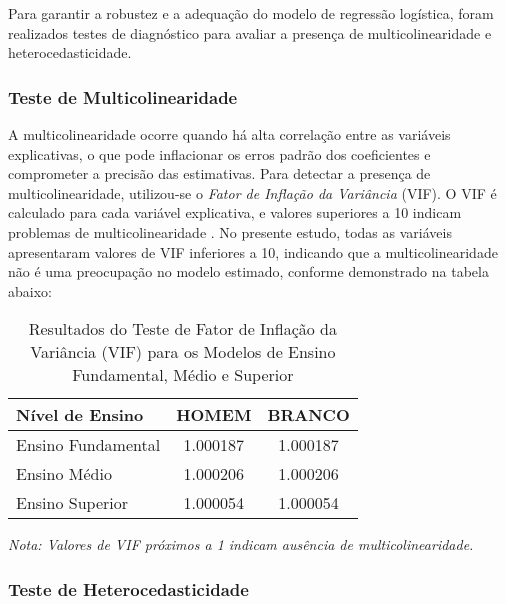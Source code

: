 \documentclass[a4paper,12pt]{article}
\begin{document}
Para garantir a robustez e a adequação do modelo de regressão logística, foram realizados testes de diagnóstico para avaliar a presença de multicolinearidade e heterocedasticidade.

\subsubsection{Teste de Multicolinearidade}

A multicolinearidade ocorre quando há alta correlação entre as variáveis explicativas, o que pode inflacionar os erros padrão dos coeficientes e comprometer a precisão das estimativas. Para detectar a presença de multicolinearidade, utilizou-se o \textit{Fator de Inflação da Variância} (VIF). O VIF é calculado para cada variável explicativa, e valores superiores a 10 indicam problemas de multicolinearidade \cite{fox2015}. No presente estudo, todas as variáveis apresentaram valores de VIF inferiores a 10, indicando que a multicolinearidade não é uma preocupação no modelo estimado, conforme demonstrado na tabela abaixo:

\begin{table}[htbp]
    \centering
    \caption{Resultados do Teste de Fator de Inflação da Variância (VIF) para os Modelos de Ensino Fundamental, Médio e Superior}
    \label{tab:vif}
    \begin{tabular}{lcc}
    \toprule
    \textbf{Nível de Ensino} & \textbf{HOMEM} & \textbf{BRANCO} \\
    \midrule
    Ensino Fundamental & 1.000187 & 1.000187 \\
    Ensino Médio       & 1.000206 & 1.000206 \\
    Ensino Superior    & 1.000054 & 1.000054 \\
    \bottomrule
    \end{tabular}
    \smallskip
    
    \footnotesize{\textit{Nota: Valores de VIF próximos a 1 indicam ausência de multicolinearidade.}}
\end{table}

\subsubsection{Teste de Heterocedasticidade}
\end{document}
